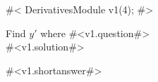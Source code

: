 

#<
DerivativesModule v1(4);
#>


Find $y'$ where #<v1.question#> \\



#<v1.solution#>



#<v1.shortanswer#>



